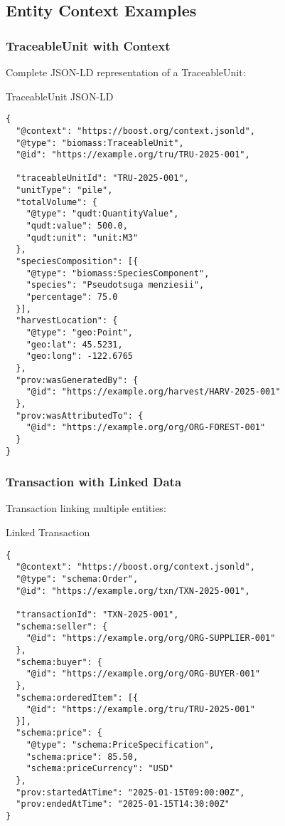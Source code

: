 \subsection{Entity Context Examples}
\label{sec:entity-context-examples}

\subsubsection{TraceableUnit with Context}

Complete JSON-LD representation of a TraceableUnit:

\begin{jsonexample}{TraceableUnit JSON-LD}
\begin{verbatim}
{
  "@context": "https://boost.org/context.jsonld",
  "@type": "biomass:TraceableUnit",
  "@id": "https://example.org/tru/TRU-2025-001",
  
  "traceableUnitId": "TRU-2025-001",
  "unitType": "pile",
  "totalVolume": {
    "@type": "qudt:QuantityValue",
    "qudt:value": 500.0,
    "qudt:unit": "unit:M3"
  },
  "speciesComposition": [{
    "@type": "biomass:SpeciesComponent",
    "species": "Pseudotsuga menziesii",
    "percentage": 75.0
  }],
  "harvestLocation": {
    "@type": "geo:Point",
    "geo:lat": 45.5231,
    "geo:long": -122.6765
  },
  "prov:wasGeneratedBy": {
    "@id": "https://example.org/harvest/HARV-2025-001"
  },
  "prov:wasAttributedTo": {
    "@id": "https://example.org/org/ORG-FOREST-001"
  }
}
\end{verbatim}
\end{jsonexample}

\subsubsection{Transaction with Linked Data}

Transaction linking multiple entities:

\begin{jsonexample}{Linked Transaction}
\begin{verbatim}
{
  "@context": "https://boost.org/context.jsonld",
  "@type": "schema:Order",
  "@id": "https://example.org/txn/TXN-2025-001",
  
  "transactionId": "TXN-2025-001",
  "schema:seller": {
    "@id": "https://example.org/org/ORG-SUPPLIER-001"
  },
  "schema:buyer": {
    "@id": "https://example.org/org/ORG-BUYER-001"
  },
  "schema:orderedItem": [{
    "@id": "https://example.org/tru/TRU-2025-001"
  }],
  "schema:price": {
    "@type": "schema:PriceSpecification",
    "schema:price": 85.50,
    "schema:priceCurrency": "USD"
  },
  "prov:startedAtTime": "2025-01-15T09:00:00Z",
  "prov:endedAtTime": "2025-01-15T14:30:00Z"
}
\end{verbatim}
\end{jsonexample}

